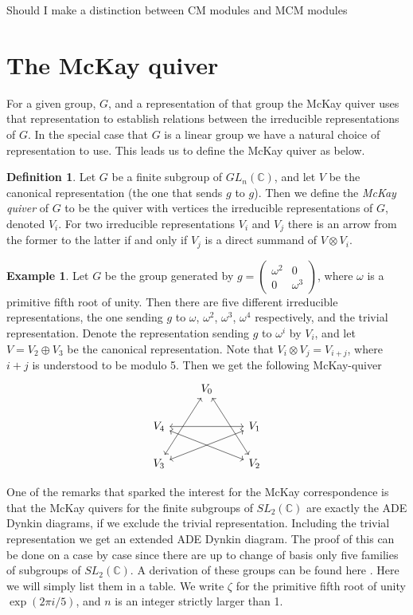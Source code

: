 \documentclass[11pt, a4paper, english]{article}
\theoremstyle{definition}
\newtheorem{defin}[theorem]{Definition}
\newtheorem{example}[theorem]{Example}
\newcommand{\C}{\mathbb{C}}
\begin{document}
{\color{red} Should I make a distinction between CM modules and MCM modules}

\section{The McKay quiver}
For a given group, $G$, and a representation of that group the McKay quiver uses that representation to establish relations between the irreducible representations of $G$. In the special case that $G$ is a linear group we have a natural choice of representation to use. This leads us to define the McKay quiver as below.
\begin{defin}
Let $G$ be a finite subgroup of $GL_n(\C)$, and let $V$ be the canonical representation (the one that sends $g$ to $g$). Then we define the \textit{McKay quiver} of $G$ to be the quiver with vertices the irreducible representations of $G$, denoted $V_i$. For two irreducible representations $V_i$ and $V_j$ there is an arrow from the former to the latter if and only if $V_j$ is a direct summand of $V \otimes V_i$.
\end{defin}

\begin{example}
Let $G$ be the group generated by $g =\begin{pmatrix}
\omega^2 & 0\\
0 & \omega^{3}
\end{pmatrix}$, where $\omega$ is a primitive fifth root of unity. Then there are five different irreducible representations, the one sending $g$ to $\omega$, $\omega^2$, $\omega^3$, $\omega^4$ respectively, and the trivial representation. Denote the representation sending $g$ to $\omega^i$ by $V_i$, and let $V = V_2 \oplus V_3$ be the canonical representation. Note that $V_i \otimes V_j = V_{i+j}$, where $i+j$ is understood to be modulo 5. Then we get the following McKay-quiver
$$
\begin{tikzcd}
& V_0 \arrow[<->]{ddr} \arrow[<->]{ddl} & \\
V_4 && V_1 \arrow[<->]{ll}\arrow[<->]{dll}\\
V_3 && V_2 \arrow[<->]{ull}
\end{tikzcd} 
$$
\end{example}

One of the remarks that sparked the interest for the McKay correspondence is that the McKay quivers for the finite subgroups of $SL_2(\C)$ are exactly the ADE Dynkin diagrams, if we exclude the trivial representation. Including the trivial representation we get an extended ADE Dynkin diagram. The proof of this can be done on a case by case since there are up to change of basis only five families of subgroups of $SL_2(\C)$. A derivation of these groups can be found here \cite{Carrasco}. Here we will simply list them in a table. We write $\zeta$ for the primitive fifth root of unity $\exp(2\pi i/5)$, and $n$ is an integer strictly larger than 1.
\end{document}
